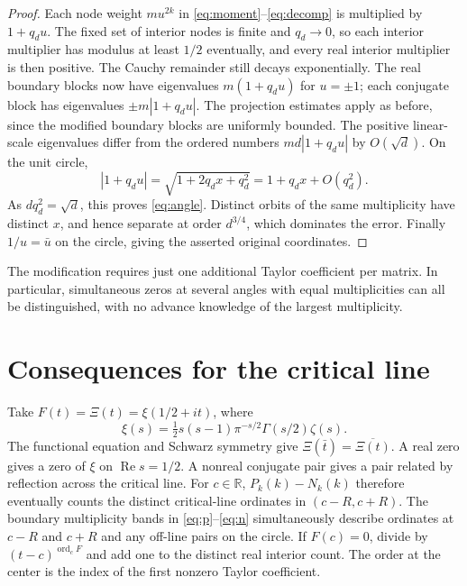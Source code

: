 \documentclass[11pt]{article}
\begin{document}
\begin{proof}
Each node weight $m u^{2k}$ in \eqref{eq:moment}--\eqref{eq:decomp} is multiplied by $1+q_d u$. The fixed set of interior nodes is finite and $q_d\to0$, so each interior multiplier has modulus at least $1/2$ eventually, and every real interior multiplier is then positive. The Cauchy remainder still decays exponentially. The real boundary blocks now have eigenvalues $m(1+q_d u)$ for $u=\pm1$; each conjugate block has eigenvalues $\pm m|1+q_d u|$. The projection estimates apply as before, since the modified boundary blocks are uniformly bounded. The positive linear-scale eigenvalues differ from the ordered numbers $md|1+q_d u|$ by $O(\sqrt d)$. On the unit circle,
\[
 |1+q_d u|=\sqrt{1+2q_dx+q_d^2}=1+q_dx+O(q_d^2).
\]
As $dq_d^2=\sqrt d$, this proves \eqref{eq:angle}. Distinct orbits of the same multiplicity have distinct $x$, and hence separate at order $d^{3/4}$, which dominates the error. Finally $1/u=\bar u$ on the circle, giving the asserted original coordinates.
\end{proof}

The modification requires just one additional Taylor coefficient per matrix. In particular, simultaneous zeros at several angles with equal multiplicities can all be distinguished, with no advance knowledge of the largest multiplicity.
\section{Consequences for the critical line}
Take $F(t)=\Xi(t)=\xi(1/2+it)$, where
\[
 \xi(s)=\tfrac12s(s-1)\pi^{-s/2}\Gamma(s/2)\zeta(s).
\]
The functional equation and Schwarz symmetry give $\Xi(\bar t)=\overline{\Xi(t)}$. A real zero gives a zero of $\xi$ on $\operatorname{Re}s=1/2$. A nonreal conjugate pair gives a pair related by reflection across the critical line. For $c\in\mathbb R$, $P_k(k)-N_k(k)$ therefore eventually counts the distinct critical-line ordinates in $(c-R,c+R)$. The boundary multiplicity bands in \eqref{eq:p}--\eqref{eq:n} simultaneously describe ordinates at $c-R$ and $c+R$ and any off-line pairs on the circle. If $F(c)=0$, divide by $(t-c)^{\operatorname{ord}_c F}$ and add one to the distinct real interior count. The order at the center is the index of the first nonzero Taylor coefficient.
\end{document}
